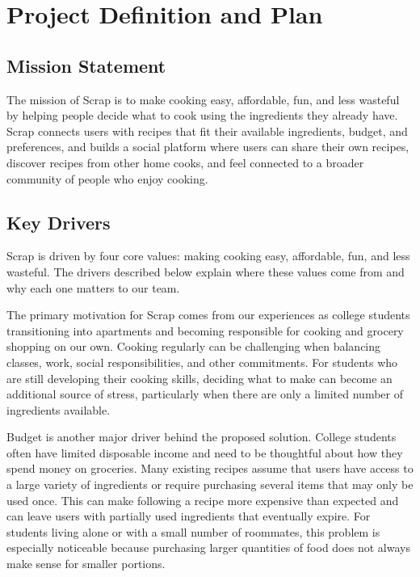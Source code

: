 \part{Project Definition and Plan}



\chapter{Mission Statement}
The mission of Scrap is to make cooking easy, affordable, fun, and less wasteful by helping people decide what to cook using the ingredients they already have. Scrap connects users with recipes that fit their available ingredients, budget, and preferences, and builds a social platform where users can share their own recipes, discover recipes from other home cooks, and feel connected to a broader community of people who enjoy cooking.

\chapter{Key Drivers}
Scrap is driven by four core values: making cooking easy, affordable, fun, and less wasteful. The drivers described below explain where these values come from and why each one matters to our team.

The primary motivation for Scrap comes from our experiences as college students transitioning into apartments and becoming responsible for cooking and grocery shopping on our own. Cooking regularly can be challenging when balancing classes, work, social responsibilities, and other commitments. For students who are still developing their cooking skills, deciding what to make can become an additional source of stress, particularly when there are only a limited number of ingredients available.

Budget is another major driver behind the proposed solution. College students often have limited disposable income and need to be thoughtful about how they spend money on groceries. Many existing recipes assume that users have access to a large variety of ingredients or require purchasing several items that may only be used once. This can make following a recipe more expensive than expected and can leave users with partially used ingredients that eventually expire. For students living alone or with a small number of roommates, this problem is especially noticeable because purchasing larger quantities of food does not always make sense for smaller portions.

